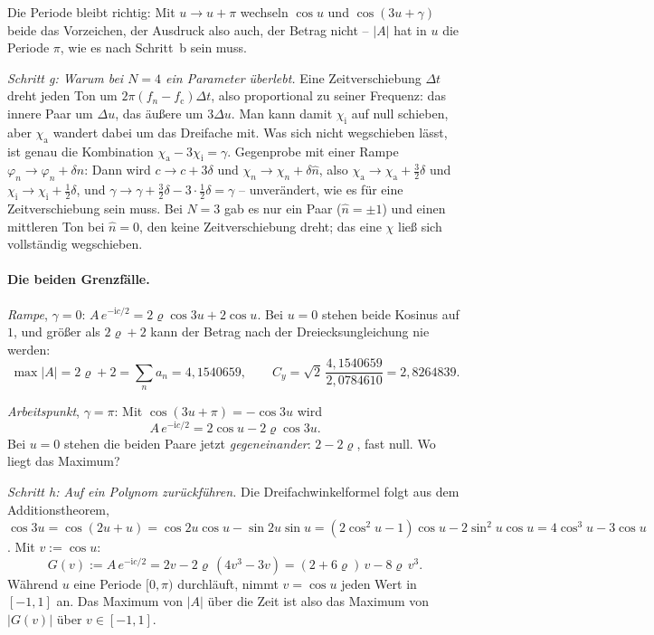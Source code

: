 \documentclass[11pt,a4paper]{article}
\newcommand{\crest}{\ensuremath{C}}
\begin{document}
Die Periode bleibt richtig: Mit $u\to u+\pi$ wechseln $\cos u$ und
$\cos(3u+\gamma)$ beide das Vorzeichen, der Ausdruck also auch, der Betrag
nicht -- $|A|$ hat in $u$ die Periode $\pi$, wie es nach Schritt~b sein muss.

\smallskip
\noindent\textit{Schritt g: Warum bei \boldmath$N=4$ ein Parameter überlebt.}
Eine Zeitverschiebung $\Delta t$ dreht jeden Ton um $2\pi(f_n-f_\mathrm{c})\Delta t$,
also proportional zu seiner Frequenz: das innere Paar um $\Delta u$, das
äußere um $3\Delta u$. Man kann damit $\chi_\mathrm{i}$ auf null schieben,
aber $\chi_\mathrm{a}$ wandert dabei um das Dreifache mit. Was sich nicht
wegschieben lässt, ist genau die Kombination $\chi_\mathrm{a}-3\chi_\mathrm{i}=\gamma$.
Gegenprobe mit einer Rampe $\varphi_n\to\varphi_n+\delta n$: Dann wird
$c\to c+3\delta$ und $\chi_n\to\chi_n+\delta\hat n$, also
$\chi_\mathrm{a}\to\chi_\mathrm{a}+\tfrac32\delta$ und
$\chi_\mathrm{i}\to\chi_\mathrm{i}+\tfrac12\delta$, und
$\gamma\to\gamma+\tfrac32\delta-3\cdot\tfrac12\delta=\gamma$ -- unverändert,
wie es für eine Zeitverschiebung sein muss. Bei $N=3$ gab es nur ein Paar
($\hat n=\pm1$) und einen mittleren Ton bei $\hat n=0$, den keine
Zeitverschiebung dreht; das eine $\chi$ ließ sich vollständig wegschieben.

\paragraph{Die beiden Grenzfälle.}
\emph{Rampe}, $\gamma=0$: $A\,e^{-\mathrm{i}c/2} = 2\varrho\cos3u + 2\cos u$.
Bei $u=0$ stehen beide Kosinus auf $1$, und größer als $2\varrho+2$ kann der
Betrag nach der Dreiecksungleichung nie werden:
\begin{equation}
  \max|A| = 2\varrho+2 = \textstyle\sum_n a_n = 4{,}1540659,
  \qquad \crest_y = \sqrt2\,\frac{4{,}1540659}{2{,}0784610} = 2{,}8264839 .
\end{equation}

\emph{Arbeitspunkt}, $\gamma=\pi$: Mit $\cos(3u+\pi) = -\cos3u$ wird
\begin{equation}
  A\,e^{-\mathrm{i}c/2} = 2\cos u - 2\varrho\cos 3u .
\end{equation}
Bei $u=0$ stehen die beiden Paare jetzt \emph{gegeneinander}: $2-2\varrho$,
fast null. Wo liegt das Maximum?

\smallskip
\noindent\textit{Schritt h: Auf ein Polynom zurückführen.}
Die Dreifachwinkelformel folgt aus dem Additionstheorem,
$\cos3u = \cos(2u+u) = \cos2u\cos u - \sin2u\sin u
= (2\cos^2u-1)\cos u - 2\sin^2u\cos u = 4\cos^3u - 3\cos u$.
Mit $v := \cos u$:
\begin{equation}
  G(v) := A\,e^{-\mathrm{i}c/2}
  = 2v - 2\varrho\,(4v^3-3v)
  = (2+6\varrho)\,v - 8\varrho\,v^3 .
\end{equation}
Während $u$ eine Periode $[0,\pi)$ durchläuft, nimmt $v=\cos u$ jeden Wert in
$[-1,1]$ an. Das Maximum von $|A|$ über die Zeit ist also das Maximum von
$|G(v)|$ über $v\in[-1,1]$.
\end{document}
